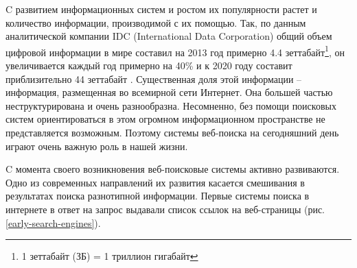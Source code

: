 \documentclass[12pt,a4paper]{report}
\newcommand\figref[1]{(рис. \ref{#1})}
\begin{document}
C развитием информационных систем и ростом их популярности растет и количество информации, производимой с их помощью. Так, по данным аналитической компании IDC (International Data Corporation) общий объем цифровой информации в мире составил на 2013 год примерно 4.4 зеттабайт\footnote{1 зеттабайт (ЗБ) = 1 триллион гигабайт}, он увеличивается каждый год примерно на 40\% и к 2020 году составит приблизительно 44 зеттабайт \cite{IDC-Analytics}. Существенная доля этой информации -- информация, размещенная во всемирной сети Интернет. Она большей частью неструктурирована и очень разнообразна. Несомненно, без помощи поисковых систем ориентироваться в этом огромном информационном пространстве не представляется возможным. Поэтому системы веб-поиска на сегодняшний день играют очень важную роль в нашей жизни.

C момента своего возникновения веб-поисковые системы активно развиваются. Одно из современных направлений их развития касается смешивания в результатах поиска разнотипной информации. Первые системы поиска в интернете в ответ на запрос выдавали список ссылок на веб-страницы \figref{early-search-engines}.
\end{document}
